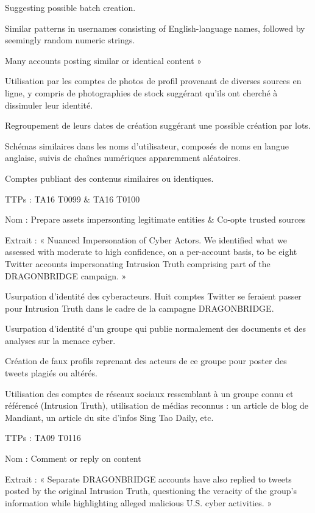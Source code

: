     Suggesting possible batch creation. 

    Similar patterns in usernames consisting of English-language names, followed by seemingly random numeric strings. 

    Many accounts posting similar or identical content »


    Utilisation par les comptes de photos de profil provenant de diverses sources en ligne, y compris de photographies de stock suggérant qu'ils ont cherché à dissimuler leur identité.

    Regroupement de leurs dates de création suggérant une possible création par lots.

    Schémas similaires dans les noms d'utilisateur, composés de noms en langue anglaise, suivis de chaînes numériques apparemment aléatoires.

    Comptes publiant des contenus similaires ou identiques.


TTPs : TA16 T0099 & TA16 T0100

Nom : Prepare assets impersonting legitimate entities & Co-opte trusted sources

Extrait : « Nuanced Impersonation of Cyber Actors. We identified what we assessed with moderate to high confidence, on a per-account basis, to be eight Twitter accounts impersonating Intrusion Truth comprising part of the DRAGONBRIDGE campaign. »

    Usurpation d'identité  des cyberacteurs. Huit comptes Twitter se feraient passer pour Intrusion Truth dans le cadre de la campagne DRAGONBRIDGE. 

    Usurpation d'identité d'un groupe qui publie normalement des documents et des analyses sur la menace cyber. 

    Création de faux profils reprenant des acteurs de ce groupe pour poster des tweets plagiés ou altérés.

    Utilisation des comptes de réseaux sociaux ressemblant à un groupe connu et référencé (Intrusion Truth), utilisation de médias reconnus : un article de blog de Mandiant, un article du site d'infos Sing Tao Daily, etc.


TTPs : TA09 T0116

Nom : Comment or reply on content

Extrait : « Separate DRAGONBRIDGE accounts have also replied to tweets posted by the original Intrusion Truth, questioning the veracity of the group’s information while highlighting alleged malicious U.S. cyber activities. »

